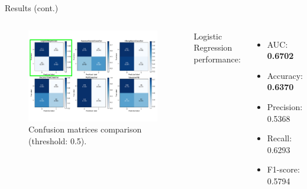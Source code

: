 \documentclass[aspectratio=169,xcolor=dvipsnames]{beamer}
\begin{document}


\begin{frame}{Results (cont.)}

    \begin{columns}[c]

        \begin{figure}[htpb]
            \centering
            \includegraphics[width=\textwidth]{confusion_matrices_annot_green}
            \caption{Confusion matrices comparison (threshold: 0.5).}
        \end{figure}
        
    
        Logistic Regression performance:
        \begin{itemize}
            \item AUC: \textbf{0.6702}
            \item Accuracy: \textbf{0.6370}
            \item Precision: 0.5368
            \item Recall: 0.6293
            \item F1-score: 0.5794
        \end{itemize}
        



\end{columns}
\end{frame}
\end{document}
